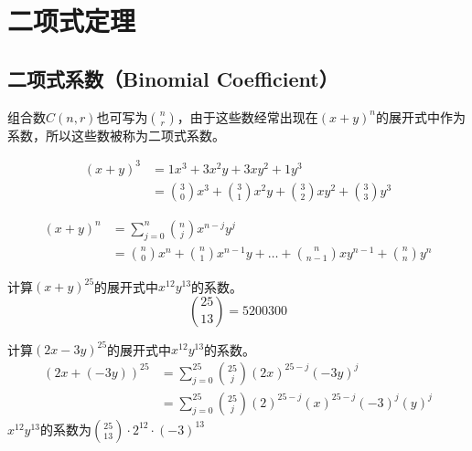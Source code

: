 \newpage

\section{二项式定理}

\subsection{二项式系数（Binomial Coefficient）}

组合数$ C(n, r) $也可写为$ n \choose r $，由于这些数经常出现在$ (x + y)^n $的展开式中作为系数，所以这些数被称为二项式系数。

\vspace{-1cm}

\begin{align*}
	(x + y)^3 & = 1x^3 + 3x^2y + 3xy^2 + 1y^3                                                     \\
	          & = {3 \choose 0} x^3 + {3 \choose 1} x^2y + {3 \choose 2} xy^2 + {3 \choose 3} y^3
\end{align*}

\begin{tcolorbox}
	\begin{align}
		(x + y)^n & = \sum_{j=0}^{n} {n \choose j}x^{n-j}y^j                                                            \\
		\nonumber
		          & = {n \choose 0} x^n + {n \choose 1} x^{n-1}y + \dots + {n \choose n-1} xy^{n-1} + {n \choose n} y^n
	\end{align}
\end{tcolorbox}

\begin{tcolorbox}
	计算$ (x + y)^{25} $的展开式中$ x^{12}y^{13} $的系数。\\
	$$
		{25 \choose 13} = 5200300
	$$
\end{tcolorbox}

\begin{tcolorbox}
	计算$ (2x - 3y)^{25} $的展开式中$ x^{12}y^{13} $的系数。
	\begin{align*}
		(2x + (-3y))^{25} & = \sum_{j=0}^{25} {25 \choose j} (2x)^{25-j} (-3y)^j                \\
		                  & = \sum_{j=0}^{25} {25 \choose j} (2)^{25-j} (x)^{25-j} (-3)^j (y)^j
	\end{align*}
	$ x^{12}y^{13} $的系数为$ {25 \choose 13} \cdot 2^{12} \cdot (-3)^{13} $
\end{tcolorbox}

